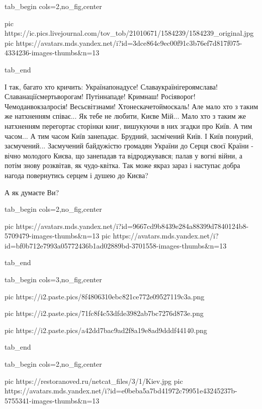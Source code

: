 \ifcmt
  tab_begin cols=2,no_fig,center

     pic https://ic.pics.livejournal.com/tov_tob/21010671/1584239/1584239_original.jpg
		 pic https://avatars.mds.yandex.net/i?id=3dce864c9ec00f91c3b76ef7d817f075-4334236-images-thumbs&n=13

  tab_end
\fi

І так, багато хто кричить: Українапонадусе! Славаукраїнігероямслава!
Славанаціїсмертьворогам! Путіннападе! Кримнаш! Росіяворог!  Чемоданвокзалросія!
Весьсвітзнами! Хтонескачетоймоскаль! Але мало хто з таким же натхненням
співає... Як тебе не любити, Києве Мій... Мало хто з таким же натхненням
перегортає сторінки книг, вишукуючи в них згадки про Київ.  А тим часом... А
тим часом Київ занепадає.  Брудний, засмічений Київ. І Київ понурий,
засмучений... Засмучений байдужістю громадян України до Серця своєї Країни -
вічно молодого Києва, що занепадав та відроджувався; палав у вогні війни, а
потім знову розквітав, як чудо-квітка.  Так може якраз зараз і наступає добра
нагода повернутись серцем і душею до Києва?

А як думаєте Ви?

\ifcmt
  tab_begin cols=2,no_fig,center

		 pic https://avatars.mds.yandex.net/i?id=9667cd9b8439e284a88399d7840124b8-5709479-images-thumbs&n=13
     pic https://avatars.mds.yandex.net/i?id=bf0b712e7993a05772436b1ad02889bd-3701558-images-thumbs&n=13

  tab_end
\fi


\ifcmt
  tab_begin cols=3,no_fig,center

     pic https://i2.paste.pics/8f4806310ebc821ce772e09527119c3a.png

		 pic https://i2.paste.pics/71fc8f4c53dfde3982ab7bc7276d873e.png

		 pic https://i2.paste.pics/a42dd7bac9ad2f8a19e8ad9dddf44140.png

  tab_end
\fi


\ifcmt
  tab_begin cols=2,no_fig,center

     pic https://restoranoved.ru/netcat_files/3/1/Kiev.jpg
		 pic https://avatars.mds.yandex.net/i?id=e0beba5a7bd41972c79951e43245237b-5755341-images-thumbs&n=13

